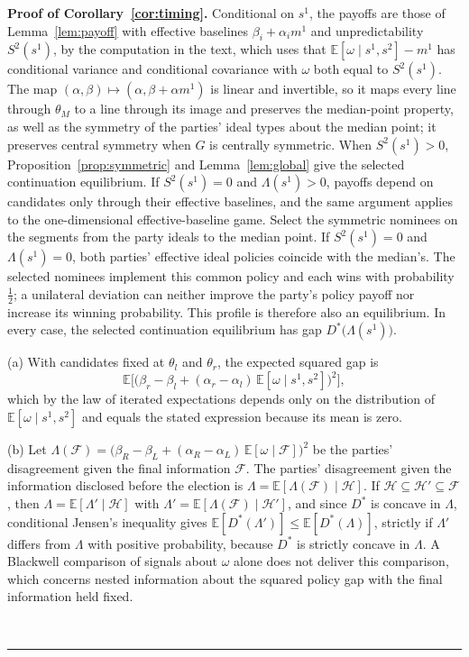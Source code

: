 \documentclass[12pt,letterpaper]{article}
\newenvironment{proof}[1][Proof]{\noindent\textbf{#1.} }{\ \rule{0.5em}{0.5em}}
\begin{document}
\begin{proof}[Proof of Corollary~\ref{cor:timing}]
Conditional on $s^1$, the payoffs are those of Lemma~\ref{lem:payoff} with effective baselines $\beta_i+\alpha_im^1$ and unpredictability $S^2(s^1)$, by the computation in the text, which uses that $\mathbb{E}[\omega\mid s^1,s^2]-m^1$ has conditional variance and conditional covariance with $\omega$ both equal to $S^2(s^1)$. The map $(\alpha,\beta)\mapsto(\alpha,\beta+\alpha m^1)$ is linear and invertible, so it maps every line through $\theta_M$ to a line through its image and preserves the median-point property, as well as the symmetry of the parties' ideal types about the median point; it preserves central symmetry when $G$ is centrally symmetric. When $S^2(s^1)>0$, Proposition~\ref{prop:symmetric} and Lemma~\ref{lem:global} give the selected continuation equilibrium. If $S^2(s^1)=0$ and $\Lambda(s^1)>0$, payoffs depend on candidates only through their effective baselines, and the same argument applies to the one-dimensional effective-baseline game. Select the symmetric nominees on the segments from the party ideals to the median point. If $S^2(s^1)=0$ and $\Lambda(s^1)=0$, both parties' effective ideal policies coincide with the median's. The selected nominees implement this common policy and each wins with probability $\tfrac12$; a unilateral deviation can neither improve the party's policy payoff nor increase its winning probability. This profile is therefore also an equilibrium. In every case, the selected continuation equilibrium has gap $D^*\big(\Lambda(s^1)\big)$.

(a) With candidates fixed at $\theta_l$ and $\theta_r$, the expected squared gap is
\[
\mathbb{E}\Big[\big(\beta_r-\beta_l+(\alpha_r-\alpha_l)\,\mathbb{E}[\omega\mid s^1,s^2]\big)^2\Big],
\]
which by the law of iterated expectations depends only on the distribution of $\mathbb{E}[\omega\mid s^1,s^2]$ and equals the stated expression because its mean is zero.

(b) Let $\Lambda(\mathcal F)=\big(\beta_R-\beta_L+(\alpha_R-\alpha_L)\,\mathbb{E}[\omega\mid\mathcal F]\big)^2$ be the parties' disagreement given the final information $\mathcal F$. The parties' disagreement given the information disclosed before the election is $\Lambda=\mathbb{E}[\Lambda(\mathcal F)\mid\mathcal H]$. If $\mathcal H\subseteq\mathcal H'\subseteq\mathcal F$, then $\Lambda=\mathbb{E}[\Lambda'\mid\mathcal H]$ with $\Lambda'=\mathbb{E}[\Lambda(\mathcal F)\mid\mathcal H']$, and since $D^*$ is concave in $\Lambda$, conditional Jensen's inequality \citep{Billingsley1995} gives $\mathbb{E}[D^*(\Lambda')]\le\mathbb{E}[D^*(\Lambda)]$, strictly if $\Lambda'$ differs from $\Lambda$ with positive probability, because $D^*$ is strictly concave in $\Lambda$. A Blackwell comparison \citep{Blackwell1953} of signals about $\omega$ alone does not deliver this comparison, which concerns nested information about the squared policy gap with the final information held fixed.


\end{proof}
\end{document}
